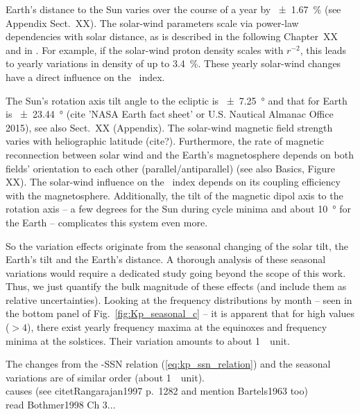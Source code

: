 Earth's distance to the Sun varies over the course of a year by \SI{+-1.67}{\percent} (see Appendix Sect.~XX). The solar-wind parameters scale via power-law dependencies with solar distance, as is described in the following Chapter~XX and in \citet{Venzmer2017}. For example, if the solar-wind proton density scales with $r^{-2}$, this leads to yearly variations in density of up to \SI{3.4}{\percent}. These yearly solar-wind changes have a direct influence on the \Kp{}~index.

The Sun's rotation axis tilt angle to the ecliptic is \SI{+-7.25}{\degree} and that for Earth is \SI{+-23.44}{\degree} (cite 'NASA Earth fact sheet' or U.S. Nautical Almanac Office 2015), see also  Sect.~XX (Appendix). The solar-wind magnetic field strength varies with heliographic latitude (cite?). Furthermore, the rate of magnetic reconnection between solar wind and the Earth's magnetosphere depends on both fields' orientation to each other (parallel/antiparallel) (see also Basics, Figure XX). The solar-wind influence on the \Kp{}~index depends on its coupling efficiency with the magnetosphere. Additionally, the tilt of the magnetic dipol axis to the rotation axis -- a few degrees for the Sun during cycle minima and about \SI{10}{\degree} for the Earth -- complicates this system even more.

So the \Kp{} variation effects originate from the seasonal changing of the solar tilt, the Earth's tilt and the Earth's distance. A thorough analysis of these seasonal variations would require a dedicated study going beyond the scope of this work. Thus, we just quantify the bulk magnitude of these effects (and include them as relative uncertainties). Looking at the \Kp{} frequency distributions by month -- seen in the bottom panel of Fig.~\ref{fig:Kp_seasonal_c} -- it is apparent that for high \Kp{} values ($>4$), there exist yearly frequency maxima at the equinoxes and frequency minima at the solstices. Their variation amounts to about 1~\Kp~unit.

The changes from the \Kp{}-SSN relation (\ref{eq:kp_ssn_relation}) and the seasonal variations are of similar order (about 1~\Kp{}~unit).\\


causes (see citet{Rangarajan1997} p.~1282 and mention Bartels1963 too)\\
read Bothmer1998 Ch 3...\\


